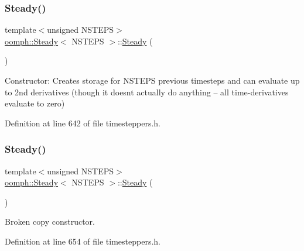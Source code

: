 \subsubsection{\texorpdfstring{Steady()}{Steady()}\hspace{0.1cm}{\footnotesize\ttfamily [1/2]}}
{\footnotesize\ttfamily template$<$unsigned N\+S\+T\+E\+PS$>$ \\
\hyperlink{classoomph_1_1Steady}{oomph\+::\+Steady}$<$ N\+S\+T\+E\+PS $>$\+::\hyperlink{classoomph_1_1Steady}{Steady} (\begin{DoxyParamCaption}{ }\end{DoxyParamCaption})\hspace{0.3cm}{\ttfamily [inline]}}



Constructor\+: Creates storage for N\+S\+T\+E\+PS previous timesteps and can evaluate up to 2nd derivatives (though it doesn\textquotesingle{}t actually do anything -- all time-\/derivatives evaluate to zero) 



Definition at line 642 of file timesteppers.\+h.

\mbox{\label{classoomph_1_1Steady_af4d22661e0a41a82bcf08de797bd59e1}} 
\subsubsection{\texorpdfstring{Steady()}{Steady()}\hspace{0.1cm}{\footnotesize\ttfamily [2/2]}}
{\footnotesize\ttfamily template$<$unsigned N\+S\+T\+E\+PS$>$ \\
\hyperlink{classoomph_1_1Steady}{oomph\+::\+Steady}$<$ N\+S\+T\+E\+PS $>$\+::\hyperlink{classoomph_1_1Steady}{Steady} (\begin{DoxyParamCaption}\item[{const \hyperlink{classoomph_1_1Steady}{Steady}$<$ N\+S\+T\+E\+PS $>$ \&}]{ }\end{DoxyParamCaption})\hspace{0.3cm}{\ttfamily [inline]}}



Broken copy constructor. 



Definition at line 654 of file timesteppers.\+h.



